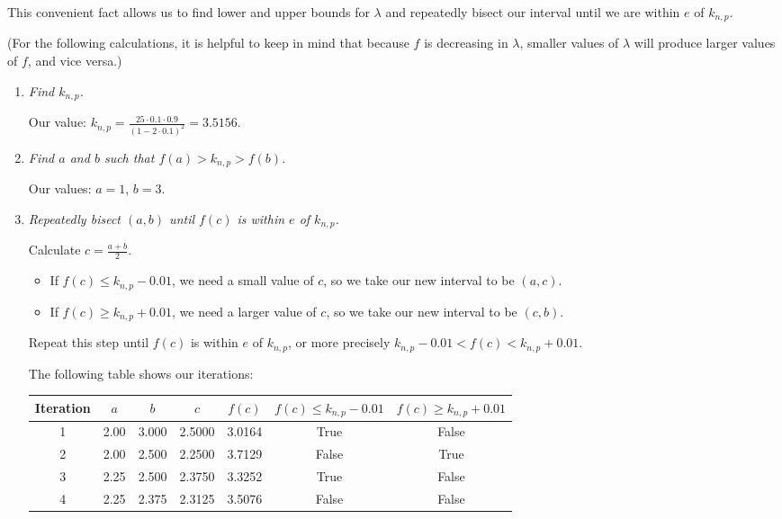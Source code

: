 \documentclass{article}
\begin{document}
This convenient fact allows us to find lower and upper bounds for $\lambda$ and
repeatedly bisect our interval until we are within $e$ of $k_{n,p}$.

(For the following calculations, it is helpful to keep in mind that because $f$
is decreasing in $\lambda$, smaller values of $\lambda$ will produce larger
values of $f$, and vice versa.)
    
\begin{enumerate}
  \item \textit{Find $k_{n,p}$.}
  
    Our value: $\displaystyle k_{n,p} = \frac{25 \cdot 0.1 \cdot 0.9}{(1 - 2\cdot0.1)^2} = 3.5156$.

  \item \textit{Find $a$ and $b$ such that $f(a) > k_{n,p} > f(b)$.}
    
    Our values: $a=1$, $b=3$.
  
  \item \textit{Repeatedly bisect $(a,b)$ until $f(c)$ is within $e$ of $k_{n,p}$.}

    Calculate $c=\frac{a+b}{2}$.

    \begin{itemize}
      \item If $f(c) \leq k_{n,p} - 0.01$, we need a small value of $c$, so we
      take our new interval to be $(a, c)$.
    
      \item If $f(c) \geq k_{n,p} + 0.01$, we need a larger value of $c$, so we
      take our new interval to be $(c, b)$.
    \end{itemize}
    
    Repeat this step until $f(c)$ is within $e$ of $k_{n,p}$, or more precisely
    $k_{n,p} - 0.01 < f(c) < k_{n,p} + 0.01$.

    The following table shows our iterations:

    \renewcommand{\arraystretch}{1.3}
    \begin{center}
      \begin{tabular}{c c c c c c c}
        Iteration & $a$  & $b$   & $c$    & $f(c)$ & $f(c) \leq k_{n,p} - 0.01$ & $f(c) \geq k_{n,p} + 0.01$ \\
        \hline
        1         & 2.00 & 3.000 & 2.5000 & 3.0164 & True                       & False \\
        2         & 2.00 & 2.500 & 2.2500 & 3.7129 & False                      & True \\
        3         & 2.25 & 2.500 & 2.3750 & 3.3252 & True                       & False \\
        4         & 2.25 & 2.375 & 2.3125 & 3.5076 & False                      & False \\
      \end{tabular}
    \end{center}


\end{enumerate}
\end{document}
